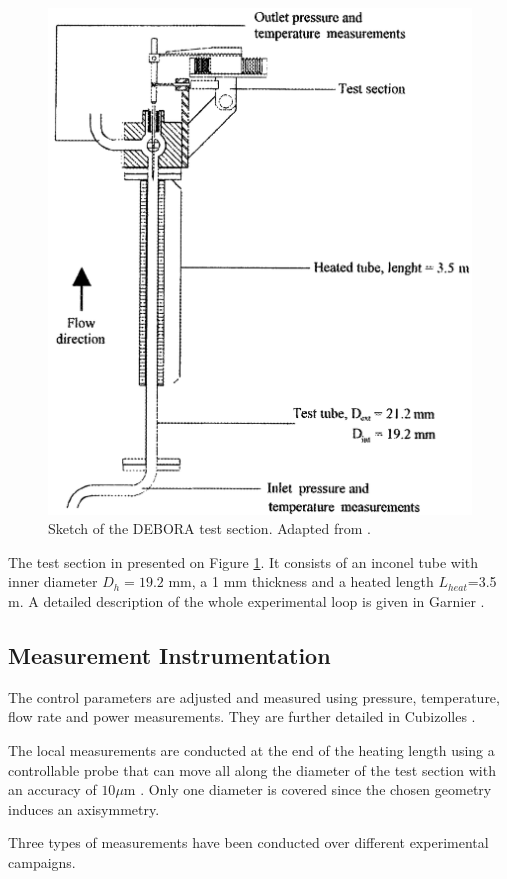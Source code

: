 \begin{figure}[!h]
\centering
\includegraphics[width=0.7\linewidth]{img/DEBORA/debora_sketch.png}
\caption{Sketch of the DEBORA test section. Adapted from \cite{garnier_local_2001}.}
\label{fig:sketch_debora}
\end{figure}


The test section in presented on Figure \ref{fig:sketch_debora}. It consists of an inconel tube with inner diameter $D_{h}=19.2$ mm, a 1 mm thickness and a heated length $L_{heat}$=3.5 m. A detailed description of the whole experimental loop is given in Garnier \etal \cite{garnier_local_2001}.

\subsection{Measurement Instrumentation}
\label{subsec:deb_mes_tech}

The control parameters are adjusted and measured using pressure, temperature, flow rate and power measurements. They are further detailed in Cubizolles \cite{cubizolles_etude_1996}.

\npar

The local measurements are conducted at the end of the heating length using a controllable probe that can move all along the diameter of the test section with an accuracy of $10 \mu$m . Only one diameter is covered since the chosen geometry induces an axisymmetry.

Three types of measurements have been conducted over different experimental campaigns.

